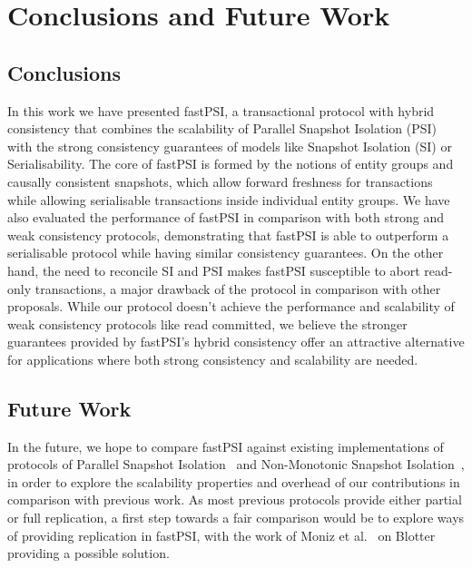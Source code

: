 \cleardoublepage
\chapter{Conclusions and Future Work}
\label{chapter:conclusion}

\section{Conclusions}

In this work we have presented fastPSI, a transactional protocol with hybrid consistency that combines the scalability of Parallel Snapshot Isolation (PSI) with the strong consistency guarantees of models like Snapshot Isolation (SI) or Serialisability. The core of fastPSI is formed by the notions of entity groups and causally consistent snapshots, which allow forward freshness for transactions while allowing serialisable transactions inside individual entity groups. We have also evaluated the performance of fastPSI in comparison with both strong and weak consistency protocols, demonstrating that fastPSI is able to outperform a serialisable protocol while having similar consistency guarantees. On the other hand, the need to reconcile SI and PSI makes fastPSI susceptible to abort read-only transactions, a major drawback of the protocol in comparison with other proposals. While our protocol doesn't achieve the performance and scalability of weak consistency protocols like read committed, we believe the stronger guarantees provided by fastPSI's hybrid consistency offer an attractive alternative for applications where both strong consistency and scalability are needed.

\section{Future Work}

In the future, we hope to compare fastPSI against existing implementations of protocols of Parallel Snapshot Isolation~\citep{psi-intro} and Non-Monotonic Snapshot Isolation~\citep{ardekani_nmsi, moniz_blotter}, in order to explore the scalability properties and overhead of our contributions in comparison with previous work. As most previous protocols provide either partial or full replication, a first step towards a fair comparison would be to explore ways of providing replication in fastPSI, with the work of Moniz et al.~\citep{moniz_blotter} on Blotter providing a possible solution.

